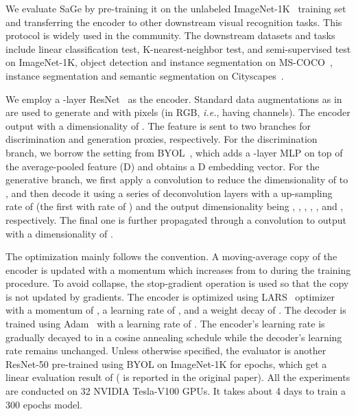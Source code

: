 \documentclass[10pt,twocolumn,letterpaper]{article}
\begin{document}
We evaluate SaGe by pre-training it on the unlabeled ImageNet-1K~\cite{russakovsky2015imagenet} training set and transferring the encoder to other downstream visual recognition tasks. This protocol is widely used in the community. The downstream datasets and tasks include linear classification test, K-nearest-neighbor test, and semi-supervised test on ImageNet-1K, object detection and instance segmentation on MS-COCO~\cite{lin2014coco}, instance segmentation and semantic segmentation on Cityscapes~\cite{cordts2016cityscapes}.

We employ a -layer ResNet~\cite{he2016deep} as the encoder. Standard data augmentations as in~\cite{grill2020bootstrap} are used to generate  and  with  pixels (in RGB, \textit{i.e.}, having  channels). The encoder output  with a dimensionality of . The feature is sent to two branches for discrimination and generation proxies, respectively. For the discrimination branch, we borrow the setting from BYOL~\cite{grill2020bootstrap}, which adds a -layer MLP on top of the average-pooled feature (D) and obtains a D embedding vector. For the generative branch, we first apply a  convolution to reduce the dimensionality of  to , and then decode it using a series of deconvolution layers with a up-sampling rate of  (the first with rate of ) and the output dimensionality being , , , , , and , respectively. The final one is further propagated through a  convolution to output  with a dimensionality of .

The optimization mainly follows the convention. A moving-average copy of the encoder is updated with a momentum which increases from  to  during the training procedure. To avoid collapse, the stop-gradient operation is used so that the copy is not updated by gradients. The encoder is optimized using LARS~\cite{huo2021large} optimizer with a momentum of , a learning rate of , and a weight decay of . The decoder is trained using Adam~\cite{adam} with a learning rate of . The encoder's learning rate is gradually decayed to  in a cosine annealing schedule while the decoder's learning rate remains unchanged. Unless otherwise specified, the evaluator is another ResNet-50 pre-trained using BYOL on ImageNet-1K for  epochs, which get a linear evaluation result of  ( is reported in the original paper). All the experiments are conducted on 32 NVIDIA Tesla-V100 GPUs.
It takes about 4 days to train a 300 epochs model.
\end{document}
